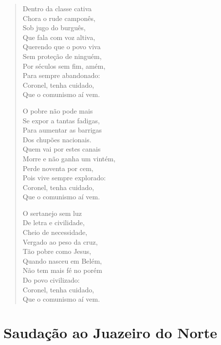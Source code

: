 \begin{verse}
Dentro da classe cativa\\
Chora o rude camponês,\\
Sob jugo do burguês,\\
Que fala com voz altiva,\\
Querendo que o povo viva\\
Sem proteção de ninguém,\\
Por séculos sem fim, amém,\\
Para sempre abandonado:\\
Coronel, tenha cuidado,\\
Que o comunismo aí vem.

O pobre não pode mais\\
Se expor a tantas fadigas,\\
Para aumentar as barrigas\\
Dos chupões nacionais.\\
Quem vai por estes canais\\
Morre e não ganha um vintém,\\
Perde noventa por cem,\\
Pois vive sempre explorado:\\
Coronel, tenha cuidado,\\
Que o comunismo aí vem.

O sertanejo sem luz\\
De letra e civilidade,\\
Cheio de necessidade,\\
Vergado ao peso da cruz,\\
Tão pobre como Jesus,\\
Quando nasceu em Belém,\\
Não tem mais fé no porém\\
Do povo civilizado:\\
Coronel, tenha cuidado,\\
Que o comunismo aí vem.
\end{verse}

\chapter{Saudação ao Juazeiro do Norte}


